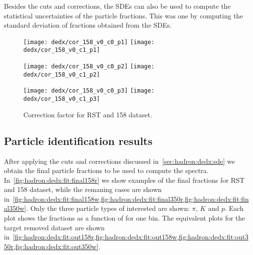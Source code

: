 Besides the cuts and corrections, the SDEs can also
be used to compute the statistical uncertainties of the particle fractions.
This was one by computing the standard deviation of
fractions obtained from the SDEs.





\begin{figure}[!ht]
  \centering
  \texttt{[image: dedx/cor\_158\_v0\_c0\_p1]}
  \texttt{[image: dedx/cor\_158\_v0\_c1\_p1]}

  \texttt{[image: dedx/cor\_158\_v0\_c0\_p2]}
  \texttt{[image: dedx/cor\_158\_v0\_c1\_p2]}

  \texttt{[image: dedx/cor\_158\_v0\_c0\_p3]}
  \texttt{[image: dedx/cor\_158\_v0\_c1\_p3]}

  \caption{Correction factor for RST and 158 \GeVc dataset.}
  \label{fig:hadron:dedx:fit:fake:cor158r}
\end{figure}


\subsection{Particle identification results}
\label{sec:hadron:dedx:results}

After applying the cuts and corrections discussed
in~\cref{sec:hadron:dedx:sde} we obtain the final
particle fractions to be used to compute the spectra.
In~\cref{fig:hadron:dedx:fit:final158r} we show examples
of the final fractions for RST and 158 \GeVc dataset,
while the remaning cases are shown 
in~\cref{fig:hadron:dedx:fit:final158w,fig:hadron:dedx:fit:final350r,fig:hadron:dedx:fit:final350w}.
Only the three particle types of interested are shown: $\pi$, $K$ and $p$.
Each plot shows the fractions as a function of \pp for one \pT bin.
The equivalent plots for the target removed dataset are shown
in~\cref{fig:hadron:dedx:fit:out158r,fig:hadron:dedx:fit:out158w,fig:hadron:dedx:fit:out350r,fig:hadron:dedx:fit:out350w}.

